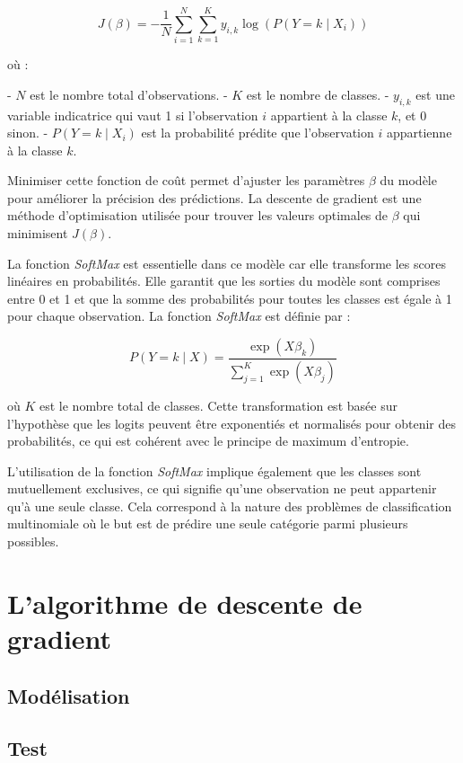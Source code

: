 \documentclass[10pt,french]{report}
\begin{document}
	\[
	J(\beta) = -\frac{1}{N} \sum_{i=1}^{N} \sum_{k=1}^{K} y_{i,k} \log\left( P(Y = k \mid X_i) \right)
	\]

	où :

	- \( N \) est le nombre total d'observations.
	- \( K \) est le nombre de classes.
	- \( y_{i,k} \) est une variable indicatrice qui vaut 1 si l'observation \( i \) appartient à la classe \( k \), et 0 sinon.
	- \( P(Y = k \mid X_i) \) est la probabilité prédite que l'observation \( i \) appartienne à la classe \( k \).

	Minimiser cette fonction de coût permet d'ajuster les paramètres \( \beta \) du modèle pour améliorer la précision des prédictions. La descente de gradient est une méthode d'optimisation utilisée pour trouver les valeurs optimales de \( \beta \) qui minimisent \( J(\beta) \).

	La fonction \textit{SoftMax} est essentielle dans ce modèle car elle transforme les scores linéaires en probabilités. Elle garantit que les sorties du modèle sont comprises entre 0 et 1 et que la somme des probabilités pour toutes les classes est égale à 1 pour chaque observation. La fonction \textit{SoftMax} est définie par :

	\[
	P(Y = k \mid X) = \frac{\exp(X\beta_k)}{\sum_{j=1}^K \exp(X\beta_j)}
	\]

	où \( K \) est le nombre total de classes. Cette transformation est basée sur l'hypothèse que les logits peuvent être exponentiés et normalisés pour obtenir des probabilités, ce qui est cohérent avec le principe de maximum d'entropie.

	L'utilisation de la fonction \textit{SoftMax} implique également que les classes sont mutuellement exclusives, ce qui signifie qu'une observation ne peut appartenir qu'à une seule classe. Cela correspond à la nature des problèmes de classification multinomiale où le but est de prédire une seule catégorie parmi plusieurs possibles.

	\section{L'algorithme de descente de gradient}

	
	\subsection{Modélisation}

	\subsection{Test}
\end{document}
